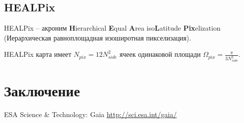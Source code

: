 \documentclass[14pt]{article} %
\begin{document}
\subsection{HEALPix}
HEALPix -- акроним \textbf{H}ierarchical \textbf{E}qual \textbf{A}rea iso\textbf{L}atitude \textbf{Pix}elization (Иерархическая равноплощадная изоширотная пикселизация).

HEALPix карта имеет $N_{pix}=12N_{side}^2$ ячеек одинаковой площади $\Omega_{pix}=\frac{\pi}{3N_{side}^2}$.
\section{Заключение}
\newpage
\begin{thebibliography}{99}
ESA Science \& Technology: Gaia \url{http://sci.esa.int/gaia/}
\end{thebibliography}
\end{document}
